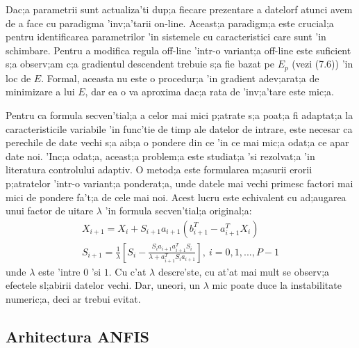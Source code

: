 Dac;a parametrii sunt actualiza'ti dup;a fiecare prezentare a datelorf atunci avem de a face cu paradigma 'inv;a'tarii on-line. Aceast;a paradigm;a este crucial;a pentru identificarea parametrilor 'in sistemele cu caracteristici care sunt 'in schimbare. Pentru a modifica regula off-line 'intr-o variant;a off-line este suficient s;a observ;am c;a gradientul descendent trebuie s;a fie bazat pe $E_{p}$ (vezi (7.6)) 'in loc de $E$. Formal, aceasta nu este o procedur;a 'in gradient adev;arat;a de minimizare a lui $E$, dar ea o va aproxima dac;a rata de 'inv;a'tare este mic;a.
\par
Pentru ca formula secven'tial;a a celor mai mici p;atrate s;a poat;a fi adaptat;a la caracteristicile variabile 'in func'tie de timp ale datelor de intrare, este necesar ca perechile de date vechi s;a aib;a o pondere din ce 'in ce mai mic;a odat;a ce apar date noi. 'Inc;a odat;a, aceast;a problem;a este studiat;a 'si rezolvat;a 'in literatura controlului adaptiv. O metod;a este formularea m;asurii erorii p;atratelor 'intr-o variant;a ponderat;a, unde datele mai vechi primesc factori mai mici de pondere fa't;a de cele mai noi. Acest lucru este echivalent cu ad;augarea unui factor de uitare $\lambda$ 'in formula secven'tial;a original;a:
\begin{equation}
\begin{aligned}
X_{i+1} = X_{i} + S_{i+1}a_{i+1}(b_{i+1}^{T} - a_{i+1}^{T}X_{i}) \\
S_{i+1} = \frac {1}{\lambda} [S_{i} - \frac {S_{i}a_{i+1}a_{i+1}^{T}S_{i}} {\lambda + a_{i+1}^{T}S_{i}a_{i+1}}],\  i = 0, 1, ..., P-1
\end{aligned}
\end{equation}
unde $\lambda$ este 'intre $0$ 'si $1$. Cu c'at $\lambda$ descre'ste, cu at'at mai mult se observ;a efectele sl;abirii datelor vechi. Dar, uneori, un $\lambda$ mic poate duce la instabilitate numeric;a, deci ar trebui evitat.

\newpage
\subsection{Arhitectura ANFIS}
\paragraph{}

